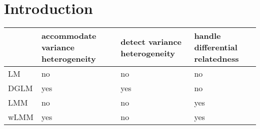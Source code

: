 \chapter{Introduction}


\begin{table}[ht]
	\begin{tabular}{lp{1in}p{1in}p{1in}}
		\toprule
				& accommodate variance heterogeneity & detect variance heterogeneity & handle differential relatedness\\
		\midrule
		LM 		& no	& no	& no\\
		DGLM 	& yes 	& yes 	& no\\
		LMM  	& no 	& no	& yes\\
		wLMM	& yes	& no	& yes\\
		\bottomrule
	\end{tabular}
\end{table}
